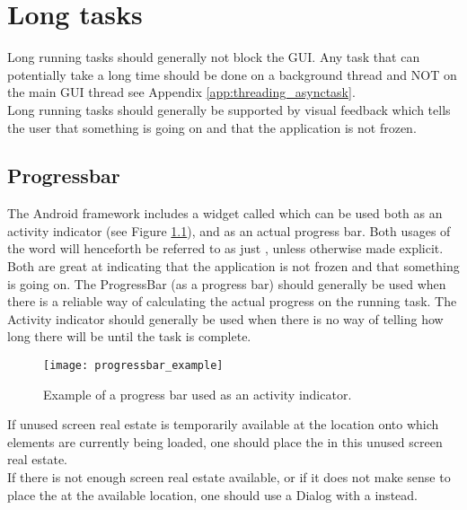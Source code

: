 
\chapter{Long tasks}
Long running tasks should generally not block the GUI. Any task that can potentially take a long time should be done on a background thread and NOT on the main GUI thread see Appendix \ref{app:threading_asynctask}. \\

\noindent Long running tasks should generally be supported by visual feedback which tells the user that something is going on and that the application is not frozen. 

\section{Progressbar}
The Android framework includes a widget called  which can be used both as an activity indicator (see Figure \ref{fig:activity_indicator_in_dialog}), and as an actual progress bar. Both usages of the word will henceforth be referred to as just , unless otherwise made explicit. Both are great at indicating that the application is not frozen and that something is going on. The ProgressBar (as a progress bar) should generally be used when there is a reliable way of calculating the actual progress on the running task. The Activity indicator should generally be used when there is no way of telling how long there will be until the task is complete. \\

\begin{figure}[!htbp]
  \centering
    \texttt{[image: progressbar\_example]}
    \caption{Example of a progress bar used as an activity indicator.}
    \label{fig:activity_indicator_in_dialog}
\end{figure}

\noindent If unused screen real estate is temporarily available at the location onto which elements are currently being loaded, one should place the  in this unused screen real estate.\\

\noindent If there is not enough screen real estate available, or if it does not make sense to place the  at the available location, one should use a Dialog with a  instead.
